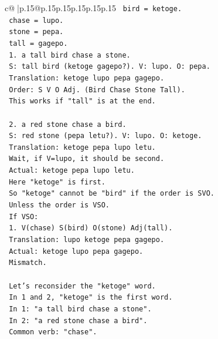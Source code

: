 \documentclass{article}
\begin{document}
{\begin{supertabular}{c@{$\;$}|p{.15\linewidth}@{}p{.15\linewidth}p{.15\linewidth}p{.15\linewidth}p{.15\linewidth}p{.15\linewidth}}
{{{\texttt{         bird = ketoge.} \\
\texttt{         chase = lupo.} \\
\texttt{         stone = pepa.} \\
\texttt{         tall = gagepo.} \\
\texttt{         1. a tall bird chase a stone.} \\
\texttt{            S: tall bird (ketoge gagepo?). V: lupo. O: pepa.} \\
\texttt{            Translation: ketoge lupo pepa gagepo.} \\
\texttt{            Order: S V O Adj. (Bird Chase Stone Tall).} \\
\texttt{            This works if "tall" is at the end.} \\
\\ 
\texttt{         2. a red stone chase a bird.} \\
\texttt{            S: red stone (pepa letu?). V: lupo. O: ketoge.} \\
\texttt{            Translation: ketoge pepa lupo letu.} \\
\texttt{            Wait, if V=lupo, it should be second.} \\
\texttt{            Actual: ketoge pepa lupo letu.} \\
\texttt{            Here "ketoge" is first.} \\
\texttt{            So "ketoge" cannot be "bird" if the order is SVO.} \\
\texttt{            Unless the order is VSO.} \\
\texttt{            If VSO:} \\
\texttt{            1. V(chase) S(bird) O(stone) Adj(tall).} \\
\texttt{               Translation: lupo ketoge pepa gagepo.} \\
\texttt{               Actual: ketoge lupo pepa gagepo.} \\
\texttt{               Mismatch.} \\
\\ 
\texttt{      Let's reconsider the "ketoge" word.} \\
\texttt{      In 1 and 2, "ketoge" is the first word.} \\
\texttt{      In 1: "a tall bird chase a stone".} \\
\texttt{      In 2: "a red stone chase a bird".} \\
\texttt{      Common verb: "chase".} \\
}}}
\end{supertabular}}
\end{document}
